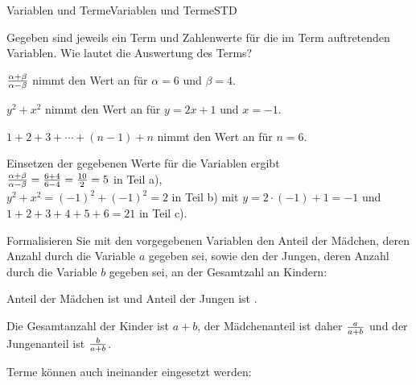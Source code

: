\begin{MXContent}{Variablen und Terme}{Variablen und Terme}{STD}
\begin{MExercise}
Gegeben sind jeweils ein Term und Zahlenwerte für die im Term auftretenden Variablen. Wie lautet die Auswertung des Terms?
\begin{MExerciseItems}
\item{$\tfrac{\alpha+\beta}{\alpha-\beta}$ nimmt den Wert  an für $\alpha=6$ und $\beta=4$.}
\item{$y^2+x^2$ nimmt den Wert  an für $y=2x+1$ und $x=-1$.}
\item{$1+2+3+\cdots+(n-1)+n$ nimmt den Wert  an für $n=6$.}
\end{MExerciseItems}
\begin{MHint}{\iSolution}
Einsetzen der gegebenen Werte für die Variablen ergibt \\ $\tfrac{\alpha+\beta}{\alpha-\beta}=\tfrac{6+4}{6-4}=\tfrac{10}{2}=5$ in Teil a), \\
$y^2+x^2=(-1)^2+(-1)^2=2$ in Teil b) mit $y=2 \cdot (-1)+1=-1$ und \\ $1+2+3+4+5+6=21$ in Teil c). %
\end{MHint}
\end{MExercise}

\begin{MExercise}
Formalisieren Sie mit den vorgegebenen Variablen den Anteil der Mädchen, deren Anzahl durch die Variable $a$ gegeben sei,
sowie den der Jungen, deren Anzahl durch die Variable $b$ gegeben sei, an der Gesamtzahl an Kindern:

Anteil der Mädchen ist  und
Anteil der Jungen ist .\\

\begin{MHint}{\iSolution}
Die Gesamtanzahl der Kinder ist $a+b$, der Mädchenanteil ist daher $\tfrac{a}{a+b}$ und der Jungenanteil ist $\tfrac{b}{a+b}$.
\end{MHint}
\end{MExercise}


Terme können auch ineinander eingesetzt werden:


\end{MXContent}
